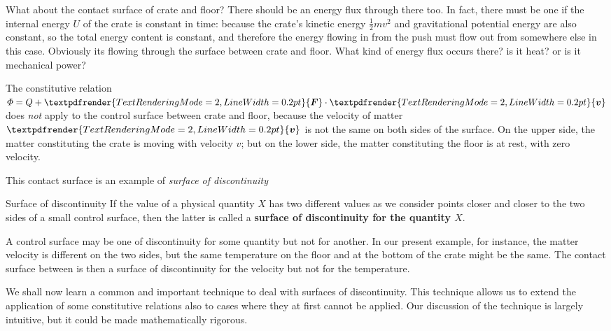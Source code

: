 \documentclass[a4paper,12pt,%
onecolumn,oneside,%
british%
]{memoir}
\renewcommand*{\bm}[1]{\textpdfrender{TextRenderingMode=2,LineWidth=0.2pt}{\boldsymbol{#1}}}
\renewcommand*{\|}[1][]{\nonscript\:#1\vert\nonscript\:\mathopen{}}
\newcommand*{\yv}{\bm{v}}
\newcommand*{\ym}{m}%
\newcommand*{\yU}{U}
\newcommand*{\yH}{\varPhi}%
\newcommand*{\yQ}{Q}%
\newcommand*{\yF}{\bm{F}}
\begin{document}
What about the contact surface of crate and floor? There should be an energy flux through there too. In fact, there must be one if the internal energy $\yU$ of the crate is constant in time: because the crate's kinetic energy $\tfrac12\ym v^{2}$ and gravitational potential energy are also constant, so the total energy content is constant, and therefore the energy flowing in from the push must flow out from somewhere else in this case. Obviously its flowing through the surface between crate and floor. What kind of energy flux occurs there? is it heat? or is it mechanical power?

The constitutive relation $\yH = \yQ + \yF\cdot \yv$ does \emph{not} apply to the control surface between crate and floor, because the velocity of matter $\yv$ is not the same on both sides of the surface. On the upper side, the matter constituting the crate is moving with velocity $v$; but on the lower side, the matter constituting the floor is at rest, with zero velocity.

This contact surface is an example of \emph{surface of discontinuity}
\begin{definition}{Surface of discontinuity}
If the value of a physical quantity $X$ has two different values as we consider points closer and closer to the two sides of a small control surface, then the latter is called a \textbf{surface of discontinuity for the quantity $X$}.
\end{definition}
A control surface may be one of discontinuity for some quantity but not for another. In our present example, for instance, the matter velocity is different on the two sides, but the same temperature on the floor and at the bottom of the crate might be the same. The contact surface between is then a surface of discontinuity for the velocity but not for the temperature.

\medskip

We shall now learn a common and important technique to deal with surfaces of discontinuity. This technique allows us to extend the application of some constitutive relations also to cases where they at first cannot be applied. Our discussion of the technique is largely intuitive, but it could be made mathematically rigorous.
\end{document}

